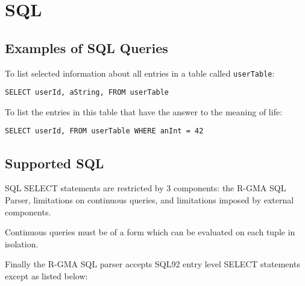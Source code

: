 \section{SQL}

\subsection{Examples of SQL Queries}
To list selected information about all entries in a table called
\texttt{userTable}:
\begin{verbatim}
SELECT userId, aString, FROM userTable
\end{verbatim} 

To list the entries in this table that have the answer to the meaning
of life:
\begin{verbatim}
SELECT userId, FROM userTable WHERE anInt = 42
\end{verbatim} 

\subsection{Supported SQL}
SQL SELECT statements are restricted by 3 components: the R-GMA SQL
Parser, limitations on continuous queries, and limitations imposed by
external components. 

Continuous queries must be of a form which can be evaluated on each
tuple in isolation.

Finally the R-GMA SQL parser accepts SQL92 entry level SELECT
statements except as listed below:

